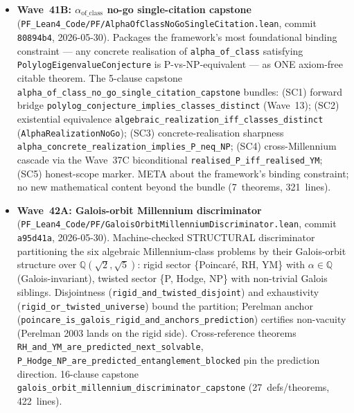 \begin{itemize}
  $\mathrm{tr}(\alpha_P) = 0$, $\mathrm{tr}(\alpha_{\mathrm{Hodge}}) = 1$,
  $\mathrm{tr}(\alpha_{\mathrm{NP}}) = 3/2$, $\mathrm{tr}(\alpha_{\mathrm{RH}}) = 3$,
  $\mathrm{tr}(\alpha_{\mathrm{YM}}) = 4$. The 27-conjunct capstone
  \texttt{cross\_quadratic\_field\_bridge\_capstone} bundles all
  blocks (56~theorems, 17~defs, 720~lines).
\item \textbf{Wave~41B: $\alpha_{\mathrm{of\_class}}$ no-go
  single-citation capstone}
  (\texttt{PF\_Lean4\_Code/PF/AlphaOfClassNoGoSingleCitation.lean},
  commit \texttt{80894b4}, 2026-05-30). Packages the framework's
  most foundational binding constraint --- any concrete realisation
  of \texttt{alpha\_of\_class} satisfying
  \texttt{PolylogEigenvalueConjecture} is P-vs-NP-equivalent --- as
  ONE axiom-free citable theorem. The 5-clause capstone
  \texttt{alpha\_of\_class\_no\_go\_single\_citation\_capstone}
  bundles: (SC1) forward bridge
  \texttt{polylog\_conjecture\_implies\_classes\_distinct}
  (Wave~13); (SC2) existential equivalence
  \texttt{algebraic\_realization\_iff\_classes\_distinct}
  (\texttt{AlphaRealizationNoGo}); (SC3) concrete-realisation
  sharpness \texttt{alpha\_concrete\_realization\_implies\_P\_neq\_NP};
  (SC4) cross-Millennium cascade via the Wave~37C biconditional
  \texttt{realised\_P\_iff\_realised\_YM}; (SC5) honest-scope
  marker. META about the framework's binding constraint;
  no new mathematical content beyond the bundle
  (7~theorems, 321~lines).
\item \textbf{Wave~42A: Galois-orbit Millennium discriminator}
  (\texttt{PF\_Lean4\_Code/PF/GaloisOrbitMillenniumDiscriminator.lean},
  commit \texttt{a95d41a}, 2026-05-30). Machine-checked STRUCTURAL
  discriminator partitioning the six algebraic Millennium-class
  problems by their Galois-orbit structure over
  $\mathbb{Q}(\sqrt{2}, \sqrt{5})$: rigid sector
  \{Poincar\'e, RH, YM\} with $\alpha \in \mathbb{Q}$
  (Galois-invariant), twisted sector \{P, Hodge, NP\} with
  non-trivial Galois siblings. Disjointness
  (\texttt{rigid\_and\_twisted\_disjoint}) and exhaustivity
  (\texttt{rigid\_or\_twisted\_universe}) bound the partition;
  Perelman anchor (\texttt{poincare\_is\_galois\_rigid\_and\_anchors\_prediction})
  certifies non-vacuity (Perelman 2003 lands on the rigid side).
  Cross-reference theorems
  \texttt{RH\_and\_YM\_are\_predicted\_next\_solvable},
  \texttt{P\_Hodge\_NP\_are\_predicted\_entanglement\_blocked}
  pin the prediction direction. 16-clause capstone
  \texttt{galois\_orbit\_millennium\_discriminator\_capstone}
  (27~defs/theorems, 422~lines).

\end{itemize}

